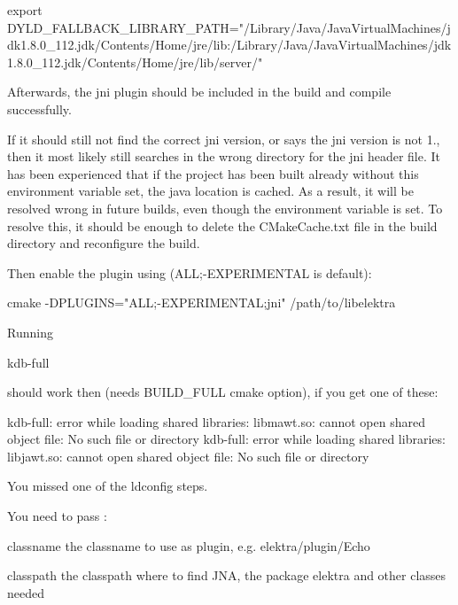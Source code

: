 \begin{DoxyCode}
export
       DYLD\_FALLBACK\_LIBRARY\_PATH="/Library/Java/JavaVirtualMachines/jdk1.8.0\_112.jdk/Contents/Home/jre/lib:/Library/Java/JavaVirtualMachines/jdk1.8.0\_112.jdk/Contents/Home/jre/lib/server/"
\end{DoxyCode}


Afterwards, the jni plugin should be included in the build and compile successfully.

If it should still not find the correct jni version, or says the jni version is not 1., then it most likely still searches in the wrong directory for the jni header file. It has been experienced that if the project has been built already without this environment variable set, the java location is cached. As a result, it will be resolved wrong in future builds, even though the environment variable is set. To resolve this, it should be enough to delete the C\+Make\+Cache.\+txt file in the build directory and reconfigure the build.

Then enable the plugin using ({\ttfamily A\+LL;-\/\+E\+X\+P\+E\+R\+I\+M\+E\+N\+T\+AL} is default)\+:


\begin{DoxyCode}
cmake -DPLUGINS="ALL;-EXPERIMENTAL;jni" /path/to/libelektra
\end{DoxyCode}


Running


\begin{DoxyCode}
kdb-full
\end{DoxyCode}


should work then (needs B\+U\+I\+L\+D\+\_\+\+F\+U\+LL cmake option), if you get one of these\+:


\begin{DoxyCode}
kdb-full: error while loading shared libraries: libmawt.so: cannot open shared object file: No such file or
       directory
kdb-full: error while loading shared libraries: libjawt.so: cannot open shared object file: No such file or
       directory
\end{DoxyCode}


You missed one of the ldconfig steps.

You need to pass \+:


\begin{DoxyItemize}
\item classname the classname to use as plugin, e.\+g. {\ttfamily elektra/plugin/\+Echo}
\item classpath the classpath where to find J\+NA, the package elektra and other classes needed
\end{DoxyItemize}

